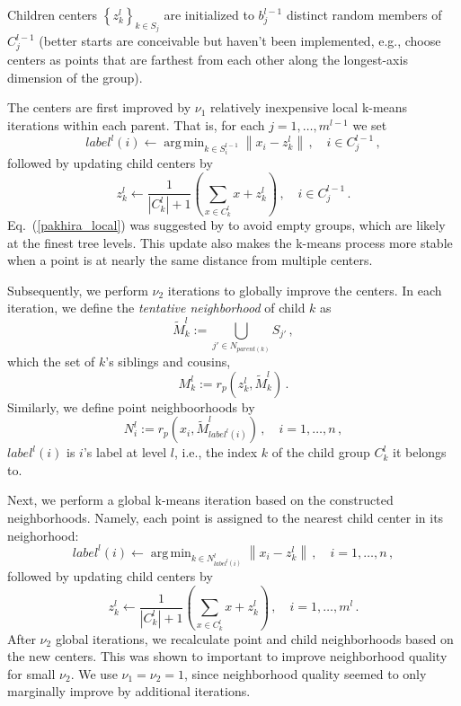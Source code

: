 \documentclass[11pt]{article}
\newcommand{\lp}{\left(}
\newcommand{\rp}{\right)}
\newcommand{\lb}{\left\{}
\newcommand{\rb}{\right\}}
\DeclareMathOperator*{\argmin}{arg\,min}
\begin{document}
Children centers $\lb z^l_k \rb_{k \in S_j}$ are initialized to $b^{l-1}_j$ distinct random members of $C^{l-1}_j$ (better starts are conceivable but haven't been implemented, e.g., choose centers as points that are farthest from each other along the longest-axis dimension of the group).

The centers are first improved by $\nu_1$ relatively inexpensive local k-means iterations within each parent. That is, for each $j=1,\dots,m^{l-1}$ we set
\begin{equation}
	label^l(i) \leftarrow \argmin_{k \in S^{l-1}_i} \left\| x_i - z^l_k\right\|\,,\quad i \in C^{l-1}_j \,,
	\label{label_local}
\end{equation}
followed by updating child centers by
\begin{equation}
	z^l_k \leftarrow \frac{1}{|C^l_k|+1} \lp \sum_{x \in C^l_k} x + z^l_k \rp\,,\quad i \in C^{l-1}_j\,.
	\label{pakhira_local}
\end{equation}
Eq.~(\ref{pakhira_local}) was suggested by \cite{pakhira} to avoid empty groups, which are likely at the finest tree levels. This update also makes the k-means process more stable when a point is at nearly the same distance from multiple centers.

Subsequently, we perform $\nu_2$ iterations to globally improve the centers. In each iteration, we define the {\it tentative neighborhood} of child $k$ as
\begin{equation}
	\tilde{M}^l_k := \bigcup_{j' \in N_{parent(k)}} S_{j'}\,,
	\label{cousins}
\end{equation}
which the set of $k$'s siblings and cousins,
\begin{equation}
	M^l_k := r_p \lp z^l_k, \tilde{M}^l_k \rp\,.
\end{equation}
Similarly, we define point neighboorhoods by
\begin{equation}
	N^l_i := r_p \lp x_i, \tilde{M}^l_{label^l(i)} \rp\,,\quad i=1,\dots,n\,,
\end{equation}
$label^l(i)$ is $i$'s label at level $l$, i.e., the index $k$ of the child group $C^l_k$ it belongs to.

Next, we perform a global k-means iteration based on the constructed neighborhoods. Namely, each point is assigned to the nearest child center in its neighorhood:
\begin{equation}
	label^l(i) \leftarrow \argmin_{k \in N^l_{label^l(i)}} \left\| x_i - z^l_k\right\|\,,\quad i = 1,\dots,n\,,
	\label{label_global}
\end{equation}
followed by updating child centers by
\begin{equation}
	z^l_k \leftarrow \frac{1}{|C^l_k|+1} \lp \sum_{x \in C^l_k} x + z^l_k \rp\,,\quad i = 1,\dots,m^l\,.
	\label{pakhira_global}
\end{equation}
After $\nu_2$ global iterations, we recalculate point and child neighborhoods based on the new centers. This was shown to important to improve neighborhood quality for small $\nu_2$. We use $\nu_1=\nu_2=1$, since neighborhood quality seemed to only marginally improve by additional iterations.
\end{document}
